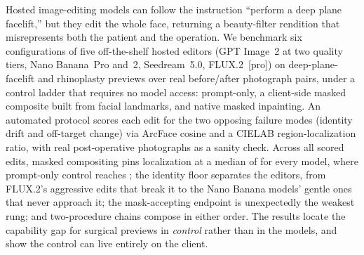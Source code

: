 Hosted image-editing models can follow the instruction ``perform a deep plane
facelift,'' but they edit the whole face, returning a beauty-filter rendition
that misrepresents both the patient and the operation. We benchmark six
configurations of five off-the-shelf hosted editors (GPT Image~2 at two quality
tiers, Nano Banana~Pro and~2, Seedream~5.0, FLUX.2~[pro]) on deep-plane-facelift and rhinoplasty
previews over real before/after photograph pairs, under a control ladder that
requires no model access: prompt-only, a client-side masked composite built from
facial landmarks, and native masked inpainting. An automated protocol scores
each edit for the two opposing failure modes (identity drift and off-target
change) via ArcFace cosine and a CIELAB region-localization ratio, with real
post-operative photographs as a sanity check. Across all \NumScoredEdits{}
scored edits, masked compositing pins localization at a median of
\MedLocComposite{} for every model, where prompt-only control reaches
\MedLocPromptOnly{}; the identity floor separates the editors, from FLUX.2's
aggressive edits that break it to the Nano Banana models' gentle ones that never
approach it; the mask-accepting endpoint is unexpectedly the weakest rung; and
two-procedure chains compose in either order. The results locate the capability
gap for surgical previews in \emph{control} rather than in the models, and show
the control can live entirely on the client.
